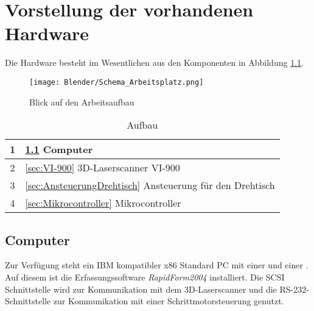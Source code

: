 \chapter{Vorstellung der vorhandenen Hardware}
\label{sec:Hardware}
Die Hardware besteht im Wesentlichen aus den Komponenten in Abbildung \ref{fig:Übersicht}.
\begin{figure}[htb]
\centering
\texttt{[image: Blender/Schema\_Arbeitsplatz.png]}
\caption{Blick auf den Arbeitsaufbau}
\label{fig:Übersicht}
\end{figure}
\begin{table}[htb]
\begin{tabular}{|c|l|}	\hline 
\rule[-1ex]{0pt}{2.5ex} 1 & 
\ref{sec:Computer} Computer\\ \hline 
\rule[-1ex]{0pt}{2.5ex} 2 & 
\ref{sec:VI-900} 3D-Laserscanner VI-900\\ \hline 
\rule[-1ex]{0pt}{2.5ex} 3 & 
\ref{sec:AnsteuerungDrehtisch} Ansteuerung für den Drehtisch\\ \hline 
\rule[-1ex]{0pt}{2.5ex} 4 & 
\ref{sec:Mikrocontroller} Mikrocontroller\\ \hline 
\end{tabular} 
\caption{Aufbau}
\label{tbl:Aufbau}
\end{table}
\section{Computer}
\label{sec:Computer}
Zur Verfügung steht ein IBM kompatibler x86 Standard PC mit 
einer  und einer . Auf diesem ist die Erfassungssoftware \emph{RapidForm2004} installiert. Die SCSI Schnittstelle wird zur Kommunikation mit dem 3D-Laserscanner und die RS-232-Schnittstelle zur Kommunikation mit einer Schrittmotorsteuerung genutzt.
